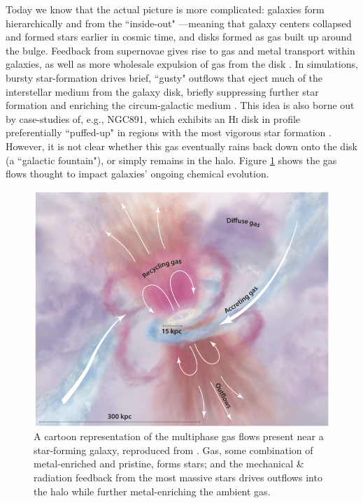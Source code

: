 Today we know that the actual picture is more complicated: galaxies form hierarchically and from the ``inside-out" \citep{wang_kauffmann_11,bovy_16}---meaning that galaxy centers collapsed and formed stars earlier in cosmic time, and disks formed as gas built up around the bulge. Feedback from supernovae gives rise to gas and metal transport within galaxies, as well as more wholesale expulsion of gas from the disk \citep[``galactic winds"][]{veilleux_15_winds}. In simulations, bursty star-formation drives brief, ``gusty" outflows that eject much of the interstellar medium from the galaxy disk, briefly suppressing further star formation and enriching the circum-galactic medium \citep[CGM,][]{muratov_15_gusty}. This idea is also borne out by case-studies of, e.g., NGC891, which exhibits an \textsc{Hi} disk in profile preferentially ``puffed-up" in regions with the most vigorous star formation \citep{oosterloo_07_ngc891}. However, it is not clear whether this gas eventually rains back down onto the disk (a ``galactic fountain"), or simply remains in the halo. Figure \ref{fig:GasFlows} shows the gas flows thought to impact galaxies' ongoing chemical evolution.

\begin{figure}
    \centering
    \includegraphics[width=\textwidth]{gasflows_tumlinson}
    \caption[A cartoon of the multiphase gas flows around galaxies]{\fixspacing A cartoon representation of the multiphase gas flows present near a star-forming galaxy, reproduced from \citet{tumlinson_peeples_werk_CGMreview}. Gas, some combination of metal-enriched and pristine, forms stars; and the mechanical \& radiation feedback from the most massive stars drives outflows into the halo while further metal-enriching the ambient gas.}
	\label{fig:GasFlows}
\end{figure}

